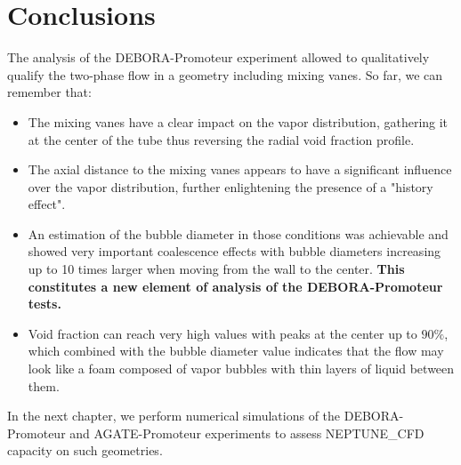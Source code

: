 

\section{Conclusions}

The analysis of the DEBORA-Promoteur experiment allowed to qualitatively qualify the two-phase flow in a geometry including mixing vanes. So far, we can remember that:

\begin{itemize}
\item The mixing vanes have a clear impact on the vapor distribution, gathering it at the center of the tube thus reversing the radial void fraction profile.

\item The axial distance to the mixing vanes appears to have a significant influence over the vapor distribution, further enlightening the presence of a "history effect". 

\item An estimation of the bubble diameter in those conditions was achievable and showed very important coalescence effects with bubble diameters increasing up to 10 times larger when moving from the wall to the center. \textbf{This constitutes a new element of analysis of the DEBORA-Promoteur tests.}

\item Void fraction can reach very high values with peaks at the center up to $90\%$, which combined with the bubble diameter value indicates that the flow may look like a foam composed of vapor bubbles with thin layers of liquid between them.
\end{itemize}


In the next chapter, we perform numerical simulations of the DEBORA-Promoteur and AGATE-Promoteur experiments to assess NEPTUNE\_CFD capacity on such geometries.